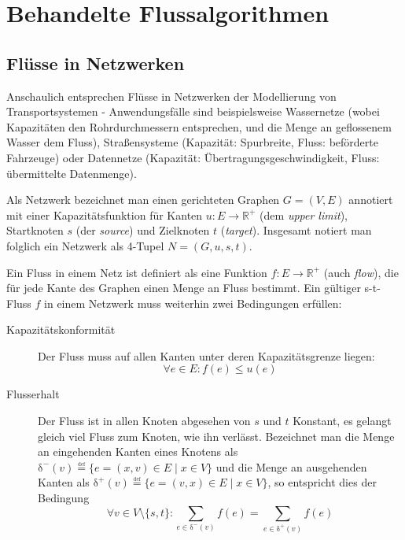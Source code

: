 \chapter{Behandelte Flussalgorithmen}

\section{Flüsse in Netzwerken}

Anschaulich entsprechen Flüsse in Netzwerken der Modellierung von Transportsystemen - Anwendungsfälle sind beispielsweise Wassernetze (wobei Kapazitäten den Rohrdurchmessern entsprechen, und die Menge an geflossenem Wasser dem Fluss), Straßensysteme (Kapazität: Spurbreite, Fluss: beförderte Fahrzeuge) oder Datennetze (Kapazität: Übertragungsgeschwindigkeit, Fluss: übermittelte Datenmenge).

Als Netzwerk bezeichnet man einen gerichteten Graphen $G=\left(V, E\right)$ annotiert mit einer Kapazitätsfunktion für Kanten $u: E \rightarrow \mathbb{R}^+$ (dem \emph{upper limit}), Startknoten $s$ (der \emph{source}) und Zielknoten $t$ (\emph{target}). Insgesamt notiert man folglich ein Netzwerk als 4-Tupel $N = \left(G, u, s, t\right)$. \cite{ wiki:fluesse}

Ein Fluss in einem Netz ist definiert als eine Funktion $f: E \rightarrow \mathbb{R}^+$  (auch \emph{flow}), die für jede Kante des Graphen einen Menge an Fluss bestimmt. Ein gültiger s-t-Fluss  $f$ in einem Netzwerk muss weiterhin zwei Bedingungen erfüllen:

\begin{description}
    \item [Kapazitätskonformität] Der Fluss muss auf allen Kanten unter deren Kapazitätsgrenze liegen:
    \[\forall e \in E :f(e)\leq u(e)\]
    \item [Flusserhalt] Der Fluss ist in allen Knoten abgesehen von $s$ und $t$ Konstant, es gelangt gleich viel Fluss zum Knoten, wie ihn verlässt. Bezeichnet man die Menge an eingehenden Kanten eines Knotens als $\operatorname{\delta^-}(v)\overset{\underset{\mathrm{def}}{}}{=}\{e=(x,v) \in E \mid x \in V \}$ und die Menge an ausgehenden Kanten als $\operatorname{\delta^+}(v)\overset{\underset{\mathrm{def}}{}}{=}\{e=(v,x) \in E \mid x \in V \}$, so entspricht dies der Bedingung 
    \[\forall v\in V \setminus \{s,t\} :\sum_{e\in \operatorname{\delta^-}(v)}f(e)
=\sum_{e \in \operatorname{\delta^+}(v)}f(e)\]
\end{description}

